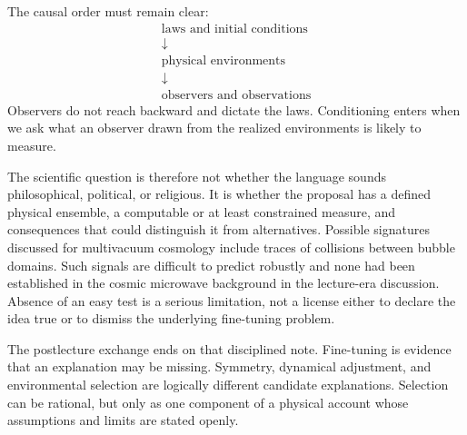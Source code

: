 \begin{classroomqa}
\end{classroomqa}

The causal order must remain clear:
\begin{equation}
\begin{gathered}
\text{laws and initial conditions}\\[-0.15em]
\downarrow\\[-0.15em]
\text{physical environments}\\[-0.15em]
\downarrow\\[-0.15em]
\text{observers and observations}
\end{gathered}
\end{equation}
Observers do not reach backward and dictate the laws. Conditioning enters when we ask what an observer drawn from the realized environments is likely to measure.

The scientific question is therefore not whether the language sounds philosophical, political, or religious. It is whether the proposal has a defined physical ensemble, a computable or at least constrained measure, and consequences that could distinguish it from alternatives. Possible signatures discussed for multivacuum cosmology include traces of collisions between bubble domains. Such signals are difficult to predict robustly and none had been established in the cosmic microwave background in the lecture-era discussion. Absence of an easy test is a serious limitation, not a license either to declare the idea true or to dismiss the underlying fine-tuning problem.

\begin{classroomqa}
\end{classroomqa}

The postlecture exchange ends on that disciplined note. Fine-tuning is evidence that an explanation may be missing. Symmetry, dynamical adjustment, and environmental selection are logically different candidate explanations. Selection can be rational, but only as one component of a physical account whose assumptions and limits are stated openly.
